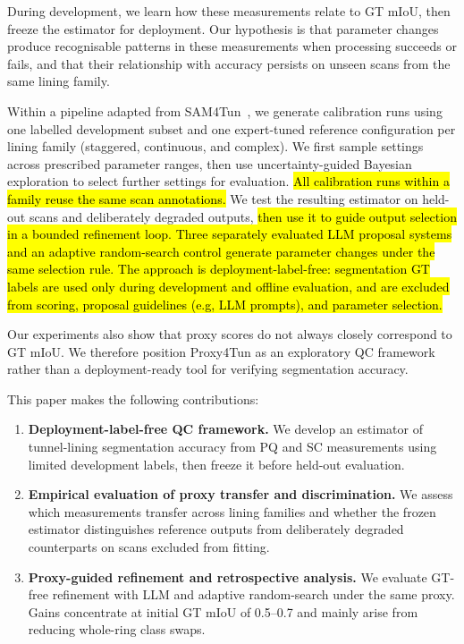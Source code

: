 \documentclass[a4paper,fleqn]{cas-dc}
\begin{document}
During development, we learn how these measurements relate to GT mIoU, then freeze the estimator for deployment. Our hypothesis is that parameter changes produce recognisable patterns in these measurements when processing succeeds or fails, and that their relationship with accuracy persists on unseen scans from the same lining family.

Within a pipeline adapted from SAM4Tun~\cite{ye2025sam4tun}, we generate calibration runs using one labelled development subset and one expert-tuned reference configuration per lining family (staggered, continuous, and complex). We first sample settings across prescribed parameter ranges, then use uncertainty-guided Bayesian exploration to select further settings for evaluation. \hl{All calibration runs within a family reuse the same scan annotations.} We test the resulting estimator on held-out scans and deliberately degraded outputs, \hl{then use it to guide output selection in a bounded refinement loop. Three separately evaluated LLM proposal systems and an adaptive random-search control generate parameter changes under the same selection rule. The approach is deployment-label-free: segmentation GT labels are used only during development and offline evaluation, and are excluded from scoring, proposal guidelines (e.g, LLM prompts), and parameter selection.}

Our experiments also show that proxy scores do not always closely correspond to GT mIoU. We therefore position Proxy4Tun as an exploratory QC framework rather than a deployment-ready tool for verifying segmentation accuracy.

This paper makes the following contributions:
\begin{enumerate}
\item \textbf{Deployment-label-free QC framework.}
We develop an estimator of tunnel-lining segmentation accuracy from PQ and SC measurements using limited development labels, then freeze it before held-out evaluation.
\item \textbf{Empirical evaluation of proxy transfer and discrimination.}
We assess which measurements transfer across lining families and whether the frozen estimator distinguishes reference outputs from deliberately degraded counterparts on scans excluded from fitting.
\item \textbf{Proxy-guided refinement and retrospective analysis.}
We evaluate GT-free refinement with LLM and adaptive random-search under the same proxy. Gains concentrate at initial GT mIoU of 0.5--0.7 and mainly arise from reducing whole-ring class swaps.
\end{enumerate}
\end{document}

